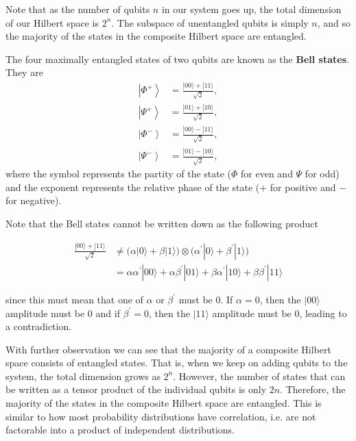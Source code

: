 \documentclass{article}
\newcommand{\ket}[1]{\ensuremath{\left|#1\right\rangle}}
\begin{document}
      Note that as the number of qubits $n$ in our system goes up, the total dimension of our Hilbert space is $2^n$. The subspace of unentangled qubits is simply $n$, and so the majority of the states in the composite Hilbert space are entangled. 

      \begin{definition}
        The four maximally entangled states of two qubits are known as the \textbf{Bell states}. They are
        \begin{align}
          \ket{\Phi^+} & = \frac{|00\rangle + |11\rangle}{\sqrt{2}}, \\
          \ket{\Psi^+} & = \frac{|01\rangle + |10\rangle}{\sqrt{2}}, \\
          \ket{\Phi^-} & = \frac{|00\rangle - |11\rangle}{\sqrt{2}}, \\
          \ket{\Psi^-} & = \frac{|01\rangle - |10\rangle}{\sqrt{2}},
        \end{align}
        where the symbol represents the partity of the state ($\Phi$ for even and $\Psi$ for odd) and the exponent represents the relative phase of the state ($+$ for positive and $-$ for negative). 
      \end{definition}

      Note that the Bell states cannot be written down as the following product

      \begin{align*}
        \frac{|00\rangle + |11 \rangle}{\sqrt{2}} & \neq \big(\alpha |0\rangle + \beta |1\rangle \big) \otimes \big( \alpha^\prime |0 \rangle + \beta^\prime |1\rangle \big) \\
        & = \alpha \alpha^\prime |00\rangle + \alpha \beta^\prime |01\rangle + \beta \alpha^\prime |10\rangle + \beta \beta^\prime |11\rangle
      \end{align*}

      since this must mean that one of $\alpha$ or $\beta^\prime$ must be $0$. If $\alpha = 0$, then the $|00\rangle$ amplitude must be $0$ and if $\beta^\prime = 0$, then the $|11\rangle$ amplitude must be $0$, leading to a contradiction. 

      With further observation we can see that the majority of a composite Hilbert space consists of entangled states. That is, when we keep on adding qubits to the system, the total dimension grows as $2^n$. However, the number of states that can be written as a tensor product of the individual qubits is only $2n$. Therefore, the majority of the states in the composite Hilbert space are entangled. This is similar to how most probability distributions have correlation, i.e. are not factorable into a product of independent distributions. 
\end{document}
